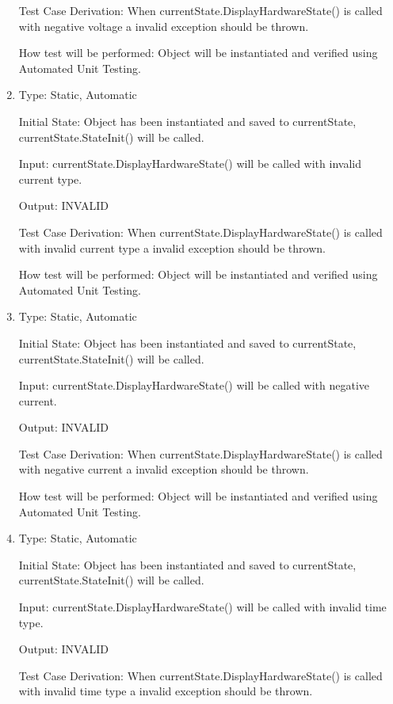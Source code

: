 \documentclass[12pt, titlepage]{article}
\begin{document}
\begin{enumerate}[{UT-CS}1.]
Test Case Derivation: When currentState.DisplayHardwareState() is called with negative voltage a invalid exception should be thrown.

How test will be performed: Object will be instantiated and verified using Automated Unit Testing.

\item

Type: Static, Automatic
					
Initial State: Object has been instantiated and saved to currentState, currentState.StateInit() will be called.
					
Input: currentState.DisplayHardwareState() will be called with invalid current type.
					
Output: INVALID

Test Case Derivation: When currentState.DisplayHardwareState() is called with invalid current type a invalid exception should be thrown.

How test will be performed: Object will be instantiated and verified using Automated Unit Testing.

\item

Type: Static, Automatic
					
Initial State: Object has been instantiated and saved to currentState, currentState.StateInit() will be called.
					
Input: currentState.DisplayHardwareState() will be called with negative current.
					
Output: INVALID

Test Case Derivation: When currentState.DisplayHardwareState() is called with negative current a invalid exception should be thrown.

How test will be performed: Object will be instantiated and verified using Automated Unit Testing.

\item

Type: Static, Automatic
					
Initial State: Object has been instantiated and saved to currentState, currentState.StateInit() will be called.
					
Input: currentState.DisplayHardwareState() will be called with invalid time type.
					
Output: INVALID

Test Case Derivation: When currentState.DisplayHardwareState() is called with invalid time type a invalid exception should be thrown.


\end{enumerate}
\end{document}
